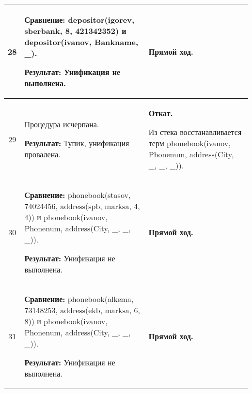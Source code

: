 \begin{longtable}{|c|p{}|p{}|}
    28
                       &
\textbf{Сравнение:} \newline
  depositor(igorev, sberbank, 8, 421342352)
    \newline и \newline
    depositor(ivanov, Bankname, \_).
    \newline

    \textbf{Результат:} \newline
    Унификация не выполнена.
                       &
    \textbf{Прямой ход.}
                       \\ \hline

    29
                       &
    Процедура исчерпана.
    \newline

    \textbf{Результат:} \newline
    Тупик, унификация провалена.
                       &
    \textbf{Откат.}
    \newline

    Из стека восстанавливается терм \newline
    phonebook(ivanov, Phonenum, address(City, \_, \_, \_)).
                       \\ \hline

    30
                       &
\textbf{Сравнение:} \newline
  phonebook(stasov, 74024456,
            address(spb,       marksa,       4,  4))
    \newline и \newline
    phonebook(ivanov, Phonenum, address(City, \_, \_, \_)).
    \newline

    \textbf{Результат:} \newline
    Унификация не выполнена.
                       &
    \textbf{Прямой ход.}
                       \\ \hline

    31
                       &
\textbf{Сравнение:} \newline
  phonebook(alkema, 73148253,
            address(ekb,       marksa,       6,  8))
    \newline и \newline
    phonebook(ivanov, Phonenum, address(City, \_, \_, \_)).
    \newline

    \textbf{Результат:} \newline
    Унификация не выполнена.
                       &
    \textbf{Прямой ход.}
                       \\ \hline


\end{longtable}
